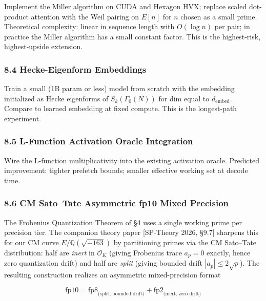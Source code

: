\documentclass[
  11pt,
]{article}
\begin{document}
Implement the Miller algorithm on CUDA and Hexagon HVX; replace scaled
dot-product attention with the Weil pairing on \(E[n]\) for \(n\) chosen
as a small prime. Theoretical complexity: linear in sequence length with
\(O(\log n)\) per pair; in practice the Miller algorithm has a small
constant factor. This is the highest-risk, highest-upside extension.

\hypertarget{hecke-eigenform-embeddings}{%
\subsubsection{8.4 Hecke-Eigenform
Embeddings}\label{hecke-eigenform-embeddings}}

Train a small (1B param or less) model from scratch with the embedding
initialized as Hecke eigenforms of \(S_k(\Gamma_0(N))\) for dim equal to
\(d_{\mathrm{embed}}\). Compare to learned embedding at fixed compute.
This is the longest-path experiment.

\hypertarget{l-function-activation-oracle-integration}{%
\subsubsection{8.5 L-Function Activation Oracle
Integration}\label{l-function-activation-oracle-integration}}

Wire the L-function multiplicativity into the existing activation
oracle. Predicted improvement: tighter prefetch bounds; smaller
effective working set at decode time.

\hypertarget{cm-satotate-asymmetric-fp10-mixed-precision}{%
\subsubsection{8.6 CM Sato--Tate Asymmetric fp10 Mixed
Precision}\label{cm-satotate-asymmetric-fp10-mixed-precision}}

The Frobenius Quantization Theorem of §4 uses a single working prime per
precision tier. The companion theory paper {[}SP-Theory 2026, §9.7{]}
sharpens this for our CM curve \(E / \mathbb{Q}(\sqrt{-163})\) by
partitioning primes via the CM Sato--Tate distribution: half are
\emph{inert} in \(\mathcal{O}_K\) (giving Frobenius trace \(a_p = 0\)
exactly, hence zero quantization drift) and half are \emph{split}
(giving bounded drift \(|a_p| \leq 2\sqrt{p}\)). The resulting
construction realizes an asymmetric mixed-precision format

\[\text{fp10} = \text{fp8}_{\text{(split, bounded drift)}} + \text{fp2}_{\text{(inert, zero drift)}}\]
\end{document}
